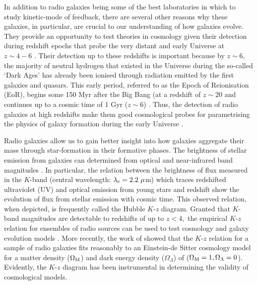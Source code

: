 \documentclass[10pt,a4paper]{article}
\begin{document}
In addition to radio galaxies being some of the best laboratories in which to study kinetic-mode of feedback, there are several other reasons why these galaxies, in particular, are crucial to our understanding of how galaxies evolve. They provide an opportunity to test theories in cosmology given their detection during redshift epochs that probe the very distant and early Universe at $z\sim4-6$ \citep{LillyLongair1984,Miley1989,Lacy1994a,
Waddington1999,VanBreugel1999,Jarvis2009,Saxena2018}. Their detection up to these redshifts is important because by $z\sim6,$ the majority of neutral hydrogen that existed in the Universe during the so-called `Dark Ages' has already been ionised through radiation emitted by the first galaxies and quasars. This early period, referred to as the Epoch of Reionisation (EoR), begins some 150 Myr after the Big Bang (at a redshift of $z\sim20$ and continues up to a cosmic time of 1 Gyr ($z\sim6$) \citep{Zaroubi2013}. Thus, the detection of radio galaxies at high redshifts make them good cosmological probes for parametrising the physics of galaxy formation during the early Universe \citep{Fan2006,Banados2018}.  

Radio galaxies allow us to gain better insight into how galaxies aggregate their mass through star-formation in their formative phases. The brightness of stellar emission from galaxies can determined from optical and near-infrared band magnitudes \citep{GunnOke1975}. In particular, the relation between the brightness of flux measured in the $K$-band (central wavelength: $\lambda_{\rm c}=2.2~\mu$m) which traces redshifted ultraviolet (UV) and optical emission from young stars and redshift show the evolution of flux from stellar emission with cosmic time. This observed relation, when depicted, is frequently called the Hubble $K$-$z$ diagram. Granted that $K$-band magnitudes are detectable to redshifts of up to $z<4,$ the empirical $K$-$z$ relation for ensembles of radio sources can be used to test cosmology and galaxy evolution models  \citep{LillyLongair1984,EalesRawlings1996,Eales1997}. More recently, the work of \citet{Inskip2002} showed that the $K$-$z$ relation for a sample of radio galaxies fits reasonably to an Einstein-de Sitter cosmology model for a matter density ($\Omega_{\rm M}$) and dark energy density ($\Omega_\Lambda$) of ($\Omega_{\rm M}=1, \Omega_\Lambda=0$). Evidently, the $K$-$z$ diagram has been instrumental in determining the validity of cosmological models.
\end{document}
